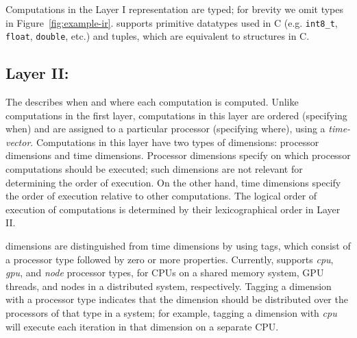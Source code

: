 Computations in the Layer I representation are typed; for brevity we omit types in Figure~\ref{fig:example-ir}.  \framework{} supports primitive datatypes used in C (e.g. \texttt{int8\_t}, \texttt{float}, \texttt{double}, etc.) and tuples, which are equivalent to structures in C.


\subsection{Layer II: \Layertwo}
\label{layer2}

The \layertwo describes when and where each computation is computed.  Unlike computations in the first layer, computations in this layer are ordered (specifying when) and are assigned to a particular processor (specifying where), using a \emph{time-\processor vector}.  Computations in this layer have two types of dimensions: processor dimensions and time dimensions.  Processor dimensions specify on which processor computations should be executed; such dimensions are not relevant for determining the order of execution.  On the other hand,  time dimensions specify the order of execution relative to other computations.  The logical order of execution of computations is determined by their lexicographical order in Layer II.


\Processor{} dimensions are distinguished from time dimensions by using tags, which consist of a processor type followed by
zero or more properties.  Currently, \framework{} supports \emph{cpu}, \emph{gpu}, and \emph{node} processor types, for
CPUs on a shared memory system, GPU threads, and nodes in a distributed system, respectively.  Tagging a dimension with
a processor type indicates that the dimension should be distributed over the processors of that type in a system; for example,
tagging a dimension with \emph{cpu} will execute each iteration in that dimension on a separate CPU.

